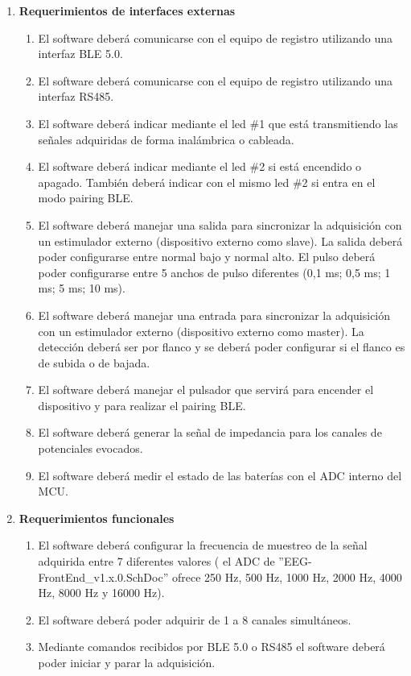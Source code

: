 \begin{enumerate}
	\item \textbf{Requerimientos de interfaces externas}
		\begin{enumerate}
			\item El software deberá comunicarse con el equipo de registro utilizando una interfaz BLE 5.0.
			\item El software deberá comunicarse con el equipo de registro utilizando una interfaz RS485. 
			\item El software deberá indicar mediante el led \#1 que está transmitiendo las señales adquiridas de forma inalámbrica o cableada. 
			\item El software deberá indicar mediante el led \#2 si está encendido o apagado. También deberá indicar con el mismo led \#2 si entra en el modo pairing BLE.
			\item El software deberá manejar una salida para sincronizar la adquisición con un estimulador externo (dispositivo externo como slave). La salida deberá poder configurarse entre normal bajo y normal alto. El pulso deberá poder configurarse entre 5 anchos de pulso diferentes (0,1 ms; 0,5 ms; 1 ms; 5 ms; 10 ms). 
			\item El software deberá manejar una entrada para sincronizar la adquisición con un estimulador externo (dispositivo externo como master). La detección deberá ser por flanco y se deberá poder configurar si el flanco es de subida o de bajada.
			\item El software deberá manejar el pulsador que servirá para encender el dispositivo y para realizar el pairing BLE.
			\item El software deberá generar la señal de impedancia para los canales de potenciales evocados.
			\item El software deberá medir el estado de las baterías con el ADC interno del MCU.
		\end{enumerate}
	\item \textbf{Requerimientos funcionales}
		\begin{enumerate}
			\item El software deberá configurar la frecuencia de muestreo de la señal adquirida entre 7 diferentes valores ( el ADC de ''EEG-FrontEnd\_v1.x.0.SchDoc” ofrece 250 Hz, 500 Hz, 1000 Hz, 2000 Hz, 4000 Hz, 8000 Hz y 16000 Hz).
			\item El software deberá poder adquirir de 1 a 8 canales simultáneos.
			\item Mediante comandos recibidos por BLE 5.0 o RS485 el software deberá poder iniciar y parar la adquisición.

\end{enumerate}
\end{enumerate}
